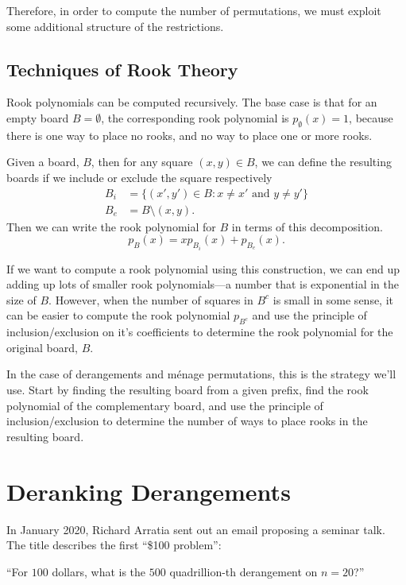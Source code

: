 Therefore, in order to compute the number of permutations, we must exploit some
additional structure of the restrictions.

\subsection{Techniques of Rook Theory}
Rook polynomials can be computed recursively. The base case is that
for an empty board $B = \emptyset$, the corresponding rook polynomial is
$p_\emptyset(x) = 1$, because there is one way to place no rooks, and no way
to place one or more rooks.
\begin{lemma}
  Given a board, $B$, then for any square $(x,y) \in B$, we can define
  the resulting boards if we include or exclude the square respectively
  \begin{align}
    B_i &= \{(x',y') \in B : x \neq x' \text{ and } y \neq y'\} \\
    B_e &= B \setminus {(x,y)}.
  \end{align}
  Then we can write the rook polynomial for $B$ in terms of this decomposition.
  \[
    p_B(x) = xp_{B_i}(x) + p_{B_e}(x).
  \]
  \label{lemma:rookPolynomialRecursion}
\end{lemma}

If we want to compute a rook polynomial using this construction, we can end
up adding up lots of smaller rook polynomials---a number that is exponential in
the size of $B$.
However, when the number of squares in $B^c$ is small in some sense, it can be
easier to compute the rook polynomial $p_{B^c}$ and use the principle of
inclusion/exclusion on it's coefficients to determine the rook polynomial for
the original board, $B$.

In the case of derangements and m\'enage permutations, this is the strategy
we'll use.
Start by finding the resulting board from a given prefix,
find the rook polynomial of the complementary board, and
use the principle of inclusion/exclusion to determine the number of ways to
place rooks in the resulting board.

\section{Deranking Derangements}

In January 2020, Richard Arratia sent out an email proposing a seminar talk.
The title describes the first ``\$100 problem'':
\begin{problem}
``For $100$ dollars, what is the $500$ quadrillion-th derangement on $n=20$?''
\end{problem}

